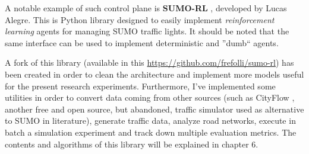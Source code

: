 A notable example of such control plane is \textbf{SUMO-RL} \cite{sumorl}, developed by Lucas Alegre. This is Python library designed to easily implement \textit{reinforcement learning} agents for managing SUMO traffic lights. It should be noted that the same interface can be used to implement deterministic and ''dumb`` agents.

A fork of this library (available in this \href{repo}{https://github.com/frefolli/sumo-rl}) has been created in order to clean the architecture and implement more models useful for the present research experiments. Furthermore, I've implemented some utilities in order to convert data coming from other sources (such as CityFlow \cite{10.1145/3308558.3314139}, another free and open source, but abandoned, traffic simulator used as alternative to SUMO in literature), generate traffic data, analyze road networks, execute in batch a simulation experiment and track down multiple evaluation metrics. The contents and algorithms of this library will be explained in chapter 6. %
